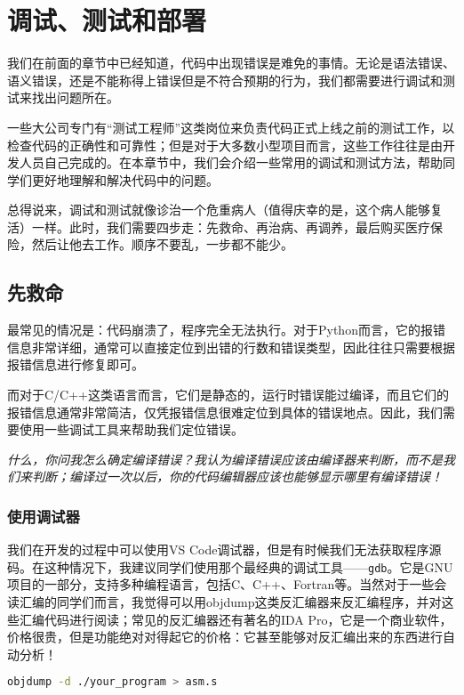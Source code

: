 \documentclass[../main.tex]{subfiles}
\begin{document}
\chapter{调试、测试和部署}

我们在前面的章节中已经知道，代码中出现错误是难免的事情。无论是语法错误、语义错误，还是不能称得上错误但是不符合预期的行为，我们都需要进行调试和测试来找出问题所在。

一些大公司专门有“测试工程师”这类岗位来负责代码正式上线之前的测试工作，以检查代码的正确性和可靠性；但是对于大多数小型项目而言，这些工作往往是由开发人员自己完成的。在本章节中，我们会介绍一些常用的调试和测试方法，帮助同学们更好地理解和解决代码中的问题。

总得说来，调试和测试就像诊治一个危重病人（值得庆幸的是，这个病人能够复活）一样。此时，我们需要四步走：先救命、再治病、再调养，最后购买医疗保险，然后让他去工作。顺序不要乱，一步都不能少。

\section{先救命}

最常见的情况是：代码崩溃了，程序完全无法执行。对于Python而言，它的报错信息非常详细，通常可以直接定位到出错的行数和错误类型，因此往往只需要根据报错信息进行修复即可。

而对于C/C++这类语言而言，它们是静态的，运行时错误能过编译，而且它们的报错信息通常非常简洁，仅凭报错信息很难定位到具体的错误地点。因此，我们需要使用一些调试工具来帮助我们定位错误。

\emph{什么，你问我怎么确定编译错误？我认为编译错误应该由编译器来判断，而不是我们来判断；编译过一次以后，你的代码编辑器应该也能够显示哪里有编译错误！}

\subsection{使用调试器}

我们在开发的过程中可以使用VS Code调试器，但是有时候我们无法获取程序源码。在这种情况下，我建议同学们使用那个最经典的调试工具——\texttt{gdb}。它是GNU项目的一部分，支持多种编程语言，包括C、C++、Fortran等。当然对于一些会读汇编的同学们而言，我觉得可以用objdump这类反汇编器来反汇编程序，并对这些汇编代码进行阅读；常见的反汇编器还有著名的IDA Pro，它是一个商业软件，价格很贵，但是功能绝对对得起它的价格：它甚至能够对反汇编出来的东西进行自动分析！
\begin{lstlisting}[language=bash]
    objdump -d ./your_program > asm.s
\end{lstlisting}
\end{document}
